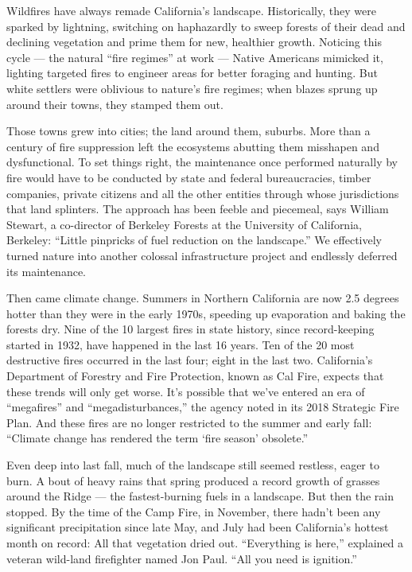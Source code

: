 Wildfires have always remade California's landscape. Historically, they
were sparked by lightning, switching on haphazardly to sweep forests of
their dead and declining vegetation and prime them for new, healthier
growth. Noticing this cycle --- the natural ``fire regimes'' at work ---
Native Americans mimicked it, lighting targeted fires to engineer areas
for better foraging and hunting. But white settlers were oblivious to
nature's fire regimes; when blazes sprung up around their towns, they
stamped them out.

Those towns grew into cities; the land around them, suburbs. More than a
century of fire suppression left the ecosystems abutting them misshapen
and dysfunctional. To set things right, the maintenance once performed
naturally by fire would have to be conducted by state and federal
bureaucracies, timber companies, private citizens and all the other
entities through whose jurisdictions that land splinters. The approach
has been feeble and piecemeal, says William Stewart, a co-director of
Berkeley Forests at the University of California, Berkeley: ``Little
pinpricks of fuel reduction on the landscape.'' We effectively turned
nature into another colossal infrastructure project and endlessly
deferred its maintenance.

Then came climate change. Summers in Northern California are now 2.5
degrees hotter than they were in the early 1970s, speeding up
evaporation and baking the forests dry. Nine of the 10 largest fires in
state history, since record-keeping started in 1932, have happened in
the last 16 years. Ten of the 20 most destructive fires occurred in the
last four; eight in the last two. California's Department of Forestry
and Fire Protection, known as Cal Fire, expects that these trends will
only get worse. It's possible that we've entered an era of ``megafires''
and ``megadisturbances,'' the agency noted in its 2018 Strategic Fire
Plan. And these fires are no longer restricted to the summer and early
fall: ``Climate change has rendered the term `fire season' obsolete.''

Even deep into last fall, much of the landscape still seemed restless,
eager to burn. A bout of heavy rains that spring produced a record
growth of grasses around the Ridge --- the fastest-burning fuels in a
landscape. But then the rain stopped. By the time of the Camp Fire, in
November, there hadn't been any significant precipitation since late
May, and July had been California's hottest month on record: All that
vegetation dried out. ``Everything is here,'' explained a veteran
wild-land firefighter named Jon Paul. ``All you need is ignition.''


